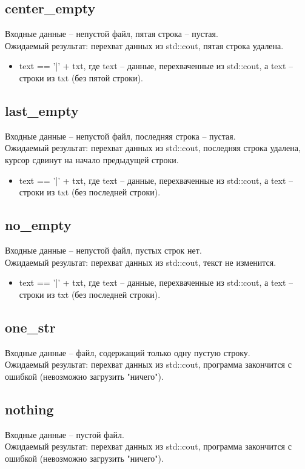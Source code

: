 \documentclass{article}
\begin{document}
\subsection{center\_empty}
Входные данные -- непустой файл, пятая строка -- пустая.\\
Ожидаемый результат: перехват данных из std::cout, пятая строка удалена.
\begin{itemize}
    \item text == '|' + txt, где text -- данные, перехваченные из std::cout, а text -- строки из txt (без пятой строки).
\end{itemize}
\subsection{last\_empty}
Входные данные -- непустой файл, последняя строка -- пустая.\\
Ожидаемый результат: перехват данных из std::cout, последняя строка удалена, курсор сдвинут на начало предыдущей строки.
\begin{itemize}
    \item text == '|' + txt, где text -- данные, перехваченные из std::cout, а text -- строки из txt (без последней строки).
\end{itemize}
\subsection{no\_empty}
Входные данные -- непустой файл, пустых строк нет.\\
Ожидаемый результат: перехват данных из std::cout, текст не изменится.
\begin{itemize}
    \item text == '|' + txt, где text -- данные, перехваченные из std::cout, а text -- строки из txt (без последней строки).
\end{itemize}
\subsection{one\_str}
Входные данные -- файл, содержащий только одну пустую строку.\\
Ожидаемый результат: перехват данных из std::cout, программа закончится с ошибкой (невозможно загрузить "ничего").
\subsection{nothing}
Входные данные -- пустой файл.\\
Ожидаемый результат: перехват данных из std::cout, программа закончится с ошибкой (невозможно загрузить "ничего").
\end{document}
